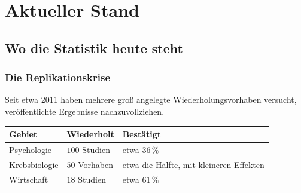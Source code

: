 \part{Aktueller Stand}

\chapter{Wo die Statistik heute steht}

\section{Die Replikationskrise}

\begin{merksatz}
Seit etwa 2011 haben mehrere groß angelegte Wiederholungsvorhaben versucht, veröffentlichte Ergebnisse nachzuvollziehen.

\begin{center}
{\small
\renewcommand{\arraystretch}{1.48}
\begin{tabular}{@{}P{2.6cm}P{2.4cm}P{3.0cm}@{}}
\toprule
\textbf{Gebiet} & \textbf{Wiederholt} & \textbf{Bestätigt}\\
\midrule
Psychologie & $100$ Studien & etwa $36\,\%$\\
Krebsbiologie & $50$ Vorhaben & etwa die Hälfte, mit kleineren Effekten\\
Wirtschaft & $18$ Studien & etwa $61\,\%$\\
\bottomrule
\end{tabular}}
\end{center}

\begin{center}
\begin{minipage}{0.88\textwidth}
\end{minipage}
\end{center}
\end{merksatz}

